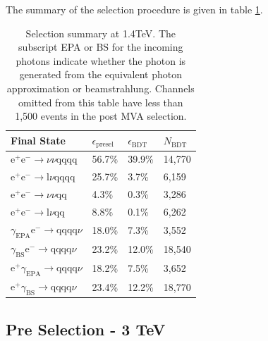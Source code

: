The summary of the selection procedure is given in table \ref{table:selectionsummary1400GeV}.

\begin{table}[h!]
\centering
\begin{tabular}{ l l l l}
\hline
Final State & $\epsilon_{\text{presel}}$ & $\epsilon_{\text{BDT}}$ & $N_{\text{BDT}}$ \\ 
\hline
$\text{e}^{+}\text{e}^{-} \rightarrow \nu{\nu}\text{qqqq}$ & 56.7\% & 39.9\% & 14,770 \\
$\text{e}^{+}\text{e}^{-} \rightarrow \text{l}\nu\text{qqqq}$ & 25.7\% & 3.7\% & 6,159 \\
$\text{e}^{+}\text{e}^{-} \rightarrow \nu{\nu}\text{qq}$ & 4.3\% & 0.3\% & 3,286 \\
$\text{e}^{+}\text{e}^{-} \rightarrow \text{l}\nu\text{qq}$ & 8.8\% & 0.1\% & 6,262 \\
$\gamma_{\text{EPA}}\text{e}^{-} \rightarrow \text{qqqq}\nu$ & 18.0\% & 7.3\% & 3,552 \\
$\gamma_{\text{BS}}\text{e}^{-} \rightarrow \text{qqqq}\nu$ & 23.2\% & 12.0\% & 18,540 \\
$\text{e}^{+}\gamma_{\text{EPA}} \rightarrow \text{qqqq}\nu$ & 18.2\% & 7.5\% & 3,652 \\
$\text{e}^{+}\gamma_{\text{BS}} \rightarrow \text{qqqq}\nu$ & 23.4\% & 12.2\% & 18,770 \\
\hline
\end{tabular}
\caption[Selection summary at 1.4TeV.]{Selection summary at 1.4TeV.   The subscript EPA or BS for the incoming photons indicate whether the photon is generated from the equivalent photon approximation or beamstrahlung.  Channels omitted from this table have less than 1,500 events in the post MVA selection.}
\label{table:selectionsummary1400GeV}
\end{table}

\subsection{Pre Selection - 3 TeV}

